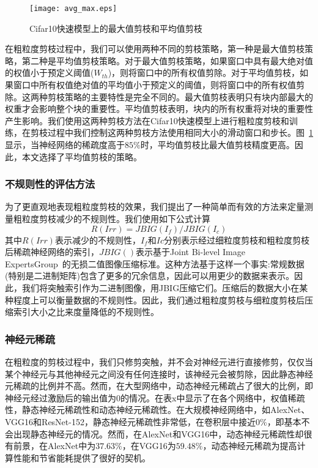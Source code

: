 \begin{figure}[t]
  \centering
  \texttt{[image: avg\_max.eps]}
  \caption{Cifar10快速模型上的最大值剪枝和平均值剪枝}
  \label{fig:max_or_avg_pruning}
\end{figure}

在粗粒度剪枝过程中，我们可以使用两种不同的剪枝策略，第一种是最大值剪枝策略，第二种是平均值剪枝策略。对于最大值剪枝策略，如果窗口中具有最大绝对值的权值小于预定义阈值($W_{th}$)，则将窗口中的所有权值剪除。对于平均值剪枝，如果窗口中所有权值绝对值的平均值小于预定义的阈值，则将窗口中的所有权值剪除。这两种剪枝策略的主要特性是完全不同的。最大值剪枝表明只有块内部最大的权重才会影响整个块的重要性。平均值剪枝表明，块内的所有权重将对块的重要性产生影响。我们使用这两种剪枝方法在Cifar10快速模型上进行粗粒度剪枝和训练，在剪枝过程中我们控制这两种剪枝方法使用相同大小的滑动窗口和步长。图~\ref{fig:max_or_avg_pruning}显示，当神经网络的稀疏度高于$85\%$时，平均值剪枝比最大值剪枝精度更高。因此，本文选择了平均值剪枝的策略。

\subsubsection{不规则性的评估方法}
为了更直观地表现粗粒度剪枝的效果，我们提出了一种简单而有效的方法来定量测量粗粒度剪枝减少的不规则性。我们使用如下公式计算
\begin{equation}
R(Irr) = JBIG(I_f)/JBIG(I_c)
\end{equation}
其中$R(Irr)$表示减少的不规则性，$I_{f}$和$I {c}$分别表示经过细粒度剪枝和粗粒度剪枝后稀疏神经网络的索引，$JBIG()$表示基于Joint Bi-level Image ExpertsGroup~\cite{jbig}的无损二值图像压缩标准。这种方法基于这样一个事实:常规数据(特别是二进制矩阵)包含了更多的冗余信息，因此可以用更少的数据来表示。因此，我们将突触索引作为二进制图像，用JBIG压缩它们。压缩后的数据大小在某种程度上可以衡量数据的不规则性。因此，我们通过粗粒度剪枝与细粒度剪枝后压缩索引大小之比来度量降低的不规则性。

\subsubsection{神经元稀疏}
在粗粒度的剪枝过程中，我们只修剪突触，并不会对神经元进行直接修剪，仅仅当某个神经元与其他神经元之间没有任何连接时，该神经元会被剪除，因此静态神经元稀疏的比例并不高。然而，在大型网络中，动态神经元稀疏占了很大的比例，即神经元经过激励后的输出值为0的情况。在表x中显示了在各个网络中，权值稀疏性，静态神经元稀疏性和动态神经元稀疏性。在大规模神经网络中，如AlexNet、VGG16和ResNet-152，静态神经元稀疏性非常低，在卷积层中接近$0\%$，即基本不会出现静态神经元的情况。然而，在AlexNet和VGG16中，动态神经元稀疏性却很有前景，在AlexNet中为$37.63\%$，在VGG16为$59.48\%$，动态神经元稀疏为提高计算性能和节省能耗提供了很好的契机。

